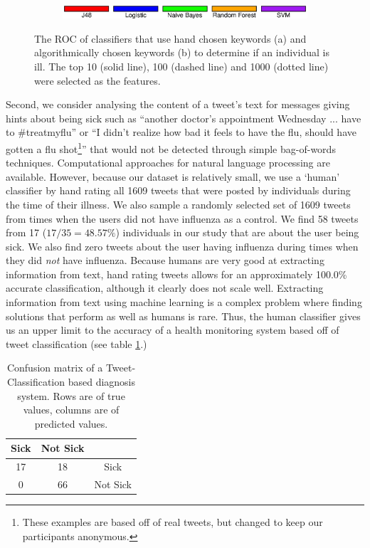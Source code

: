 \begin{figure} [h]
\begin{subfigure}[b]{.4\textwidth}
\end{subfigure}
\begin{subfigure}[b]{.9\textwidth}
\includegraphics[width=\textwidth]{diagnosis/figs/keyword_legend.eps}
\end{subfigure}
\caption{The ROC of classifiers that use hand chosen keywords (a) and algorithmically chosen keywords (b) to determine if an individual is ill. The top 10 (solid line), 100 (dashed line) and 1000 (dotted line) were selected as the features.}
\label{fig:roc_keyword}
\end{figure}


Second, we consider analysing the content of a tweet's text for messages giving hints about being sick such as ``another doctor's appointment Wednesday ... have to \#treatmyflu'' or ``I didn't realize how bad it feels to have the flu, should have gotten a flu shot\footnote{These examples are based off of real tweets, but changed to keep our participants anonymous.}'' that would not be detected through simple bag-of-words techniques. Computational approaches for natural language processing are available. However, because our dataset is relatively small, we use a `human' classifier by hand rating all 1609 tweets that were posted by individuals during the time of their illness. We also sample a randomly selected set of 1609 tweets from times when the users did not have influenza as a control. We find 58 tweets from 17 (\(17/35 = 48.57\%\))  individuals in our study that are about the user being sick. We also find zero tweets about the user having influenza during times when they did \emph{not} have influenza. Because humans are very good at extracting information from text, hand rating tweets allows for an approximately 100.0\% accurate classification, although it clearly does not scale well. Extracting information from text using machine learning is a complex problem where finding solutions that perform as well as humans is rare. Thus, the human classifier gives us an upper limit to the accuracy of a health monitoring system based off of tweet classification (see table \ref{tab:tweet_classified_confusion}.)

\begin{table}
\centering
\begin{tabular}{|c|c|c|} \hline
Sick&Not Sick&\ \\ \hline
17 & 18 & Sick\\ \hline
0 & 66  & Not Sick\\
\hline\end{tabular}
\caption{Confusion matrix of a Tweet-Classification based diagnosis system. Rows are of true values, columns are of predicted values.}
\label{tab:tweet_classified_confusion}
\end{table}

